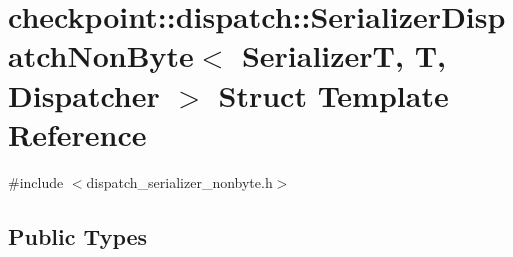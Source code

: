 \hypertarget{structcheckpoint_1_1dispatch_1_1_serializer_dispatch_non_byte}{}\section{checkpoint\+:\+:dispatch\+:\+:Serializer\+Dispatch\+Non\+Byte$<$ SerializerT, T, Dispatcher $>$ Struct Template Reference}
\label{structcheckpoint_1_1dispatch_1_1_serializer_dispatch_non_byte}


{\ttfamily \#include $<$dispatch\+\_\+serializer\+\_\+nonbyte.\+h$>$}

\subsection*{Public Types}
